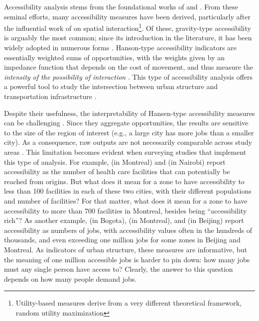 \documentclass[]{elsarticle} %
\begin{document}
Accessibility analysis stems from the foundational works of
\citet{harris_market_1954} and \citet{hansen1959}. From these seminal
efforts, many accessibility measures have been derived, particularly
after the influential work of \citet{wilson1971} on spatial
interaction\footnote{Utility-based measures derive from a very different
  theoretical framework, random utility maximization}. Of these,
gravity-type accessibility is arguably the most common; since its
introduction in the literature, it has been widely adopted in numerous
forms
\citep{cervero_transportation_2002, paez2004network, geurs2004, levinson_accessibility_1998, Arranz2019measuring}.
Hanson-type accessibility indicators are essentially weighted sums of
opportunities, with the weights given by an impedance function that
depends on the cost of movement, and thus measure the \emph{intensity of
the possibility of interaction} \citep{hansen1959}. This type of
accessibility analysis offers a powerful tool to study the intersection
between urban structure and transportation infrastructure
\citep{handy_measuring_1997}.

Despite their usefulness, the interpretability of Hansen-type
accessibility measures can be challenging \citep{geurs2004, miller2018}.
Since they aggregate opportunities, the results are sensitive to the
size of the region of interest (e.g., a large city has more jobs than a
smaller city). As a consequence, raw outputs are not necessarily
comparable across study areas \citep{allen2019}. This limitation becomes
evident when surveying studies that implement this type of analysis. For
example, \citet{paez_healthcare_2010} (in Montreal) and
\citet{campbell_2019_accessibility} (in Nairobi) report accessibility as
the number of health care facilities that can potentially be reached
from origins. But what does it mean for a zone to have accessibility to
less than 100 facilities in each of these two cities, with their
different populations and number of facilities? For that matter, what
does it mean for a zone to have accessibility to more than 700
facilities in Montreal, besides being ``accessibility rich''? As another
example, \citet{bocarejo_s_transport_2012} (in Bogota),
\citet{elgeneidy_cost_2016} (in Montreal), and
\citet{jiang_2016_accessibility} (in Beijing) report accessibility as
numbers of jobs, with accessibility values often in the hundreds of
thousands, and even exceeding one million jobs for some zones in Beijing
and Montreal. As indicators of urban structure, these measures are
informative, but the meaning of one million accessible jobs is harder to
pin down: how many jobs must any single person have access to? Clearly,
the answer to this question depends on how many people demand jobs.
\end{document}
